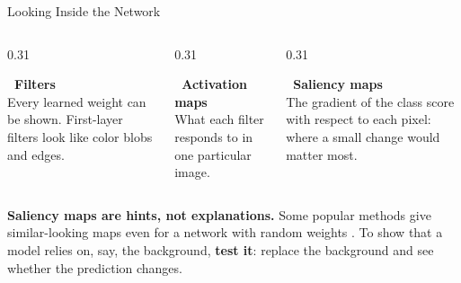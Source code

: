 \begin{frame}{Looking Inside the Network}
\begin{columns}[T]
\begin{column}{0.31\textwidth}
\begin{graybox}[height=2.6cm]
\raggedright\textbf{\faTh\ Filters}\\
Every learned weight can be shown. First-layer filters look like color blobs and edges.
\end{graybox}
\end{column}
\begin{column}{0.31\textwidth}
\begin{graybox}[height=2.6cm]
\raggedright\textbf{\faLayerGroup\ Activation maps}\\
What each filter responds to in one particular image.
\end{graybox}
\end{column}
\begin{column}{0.31\textwidth}
\begin{graybox}[height=2.6cm]
\raggedright\textbf{\faSearch\ Saliency maps}\\
The gradient of the class score with respect to each pixel: where a small change would matter
most.
\end{graybox}
\end{column}
\end{columns}

\vspace{0.15cm}
\begin{warnbox}
\textbf{Saliency maps are hints, not explanations.} Some popular methods give similar-looking maps
even for a network with random weights . To show that a model relies
on, say, the background, \textbf{test it}: replace the background and see whether the prediction
changes.
\end{warnbox}
\end{frame}

